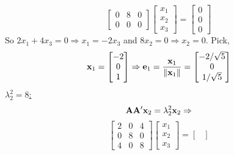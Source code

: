 \begin{enumerate}[label=(\alph*)]
\[\begin{bmatrix}
                    0 & 8 & 0 \\
                    0 & 0 & 0
                \end{bmatrix}
                \begin{bmatrix}
                    x_1 \\
                    x_2 \\
                    x_3
                \end{bmatrix}
                =
                \begin{bmatrix}
                    0 \\
                    0 \\
                    0
                \end{bmatrix}
            \]
            So $2x_1 + 4x_3 = 0 \Rightarrow x_1 = -2x_3$ and $8x_2 = 0 \Rightarrow x_2 = 0$. Pick,
            \[
                \bold{x}_1
                =
                \begin{bmatrix}
                    -2 \\
                    0 \\
                    1
                \end{bmatrix}
                \Rightarrow
                \bold{e}_1
                =
                \frac{\bold{x}_1}{\left\|\bold{x}_1\right\|}
                =
                \begin{bmatrix}
                    -2/\sqrt{5} \\
                    0 \\
                    1/\sqrt{5}
                \end{bmatrix}
            \]
            \underline{$\lambda_2^2 = 8$:}
            \[
                \bold{A}\bold{A}^\prime\bold{x}_2=\lambda_2^2\bold{x}_2
                \Rightarrow
            \]
            \[
                \begin{bmatrix}
                    2 & 0 & 4 \\
                    0 & 8 & 0 \\
                    4 & 0 & 8
                \end{bmatrix}
                \begin{bmatrix}
                    x_1 \\
                    x_2 \\
                    x_3
                \end{bmatrix}
                =
                \begin{bmatrix}

\end{bmatrix}\]
\end{enumerate}
